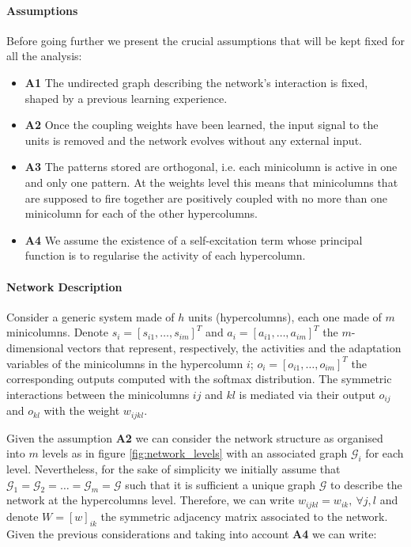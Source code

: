 \paragraph{Assumptions}
Before going further we present the crucial assumptions that will be kept fixed for all the analysis:
 \begin{itemize}
     \item \textbf{A1} The undirected graph describing the network's interaction is fixed, shaped by a previous learning experience.
     \item \textbf{A2} Once the coupling weights have been learned, the input signal to the units is removed and the network evolves without any external input.
     \item \textbf{A3} The patterns stored are orthogonal, i.e. each minicolumn is active in one and only one pattern. At the weights level this means that minicolumns that are supposed to fire together are positively coupled with no more than one minicolumn for each of the other hypercolumns. 
     \item \textbf{A4} We assume the existence of a self-excitation term whose principal function is to regularise the activity of each hypercolumn. 
 \end{itemize}
 
\paragraph{Network Description}
Consider a generic system made of $h$ units (hypercolumns), each one made of $m$ minicolumns. Denote $s_i = [s_{i1}, \dots, s_{im}]^T$ and $a_i = [a_{i1}, \dots, a_{im}]^T$ the $m$-dimensional vectors that represent, respectively, the activities and the adaptation variables of the minicolumns in the hypercolumn $i$; $o_i = [o_{i1}, \dots, o_{im}]^T$ the corresponding outputs computed with the softmax distribution. The symmetric interactions between the minicolumns $ij$ and $kl$ is mediated via their output $o_{ij}$ and $o_{kl}$ with the weight \textbf{$w_{ijkl}$}.

Given the assumption \textbf{A2} we can consider the network structure as organised into $m$ levels as in figure \cref{fig:network_levels} with an associated graph $\mathcal{G}_i$ for each level. Nevertheless, for the sake of simplicity we initially assume that $\mathcal{G}_1 = \mathcal{G}_2 = \dots = \mathcal{G}_m=\mathcal{G}$ such that it is sufficient a unique graph $\mathcal{G}$ to describe the network at the hypercolumns level. Therefore, we can write $w_{ijkl}=w_{ik},\ \forall j, l$ and denote $W =\left[w\right]_{ik}$ the symmetric adjacency matrix associated to the network. Given the previous considerations and taking into account \textbf{A4} we can write:

